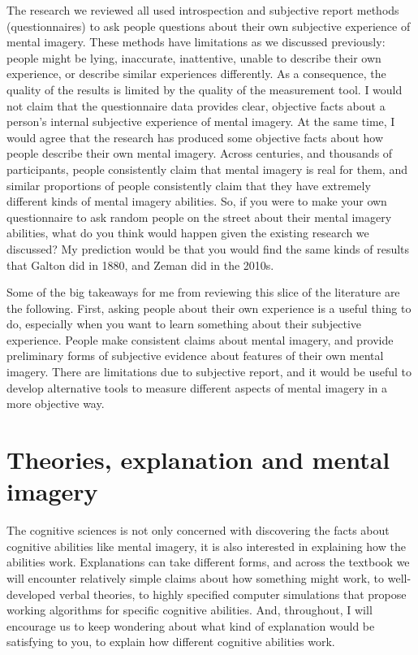 \documentclass[
  oneside,
  12pt]{crumpbook}
\begin{document}
The research we reviewed all used introspection and subjective report methods (questionnaires) to ask people questions about their own subjective experience of mental imagery. These methods have limitations as we discussed previously: people might be lying, inaccurate, inattentive, unable to describe their own experience, or describe similar experiences differently. As a consequence, the quality of the results is limited by the quality of the measurement tool. I would not claim that the questionnaire data provides clear, objective facts about a person's internal subjective experience of mental imagery. At the same time, I would agree that the research has produced some objective facts about how people describe their own mental imagery. Across centuries, and thousands of participants, people consistently claim that mental imagery is real for them, and similar proportions of people consistently claim that they have extremely different kinds of mental imagery abilities. So, if you were to make your own questionnaire to ask random people on the street about their mental imagery abilities, what do you think would happen given the existing research we discussed? My prediction would be that you would find the same kinds of results that Galton did in 1880, and Zeman did in the 2010s.

Some of the big takeaways for me from reviewing this slice of the literature are the following. First, asking people about their own experience is a useful thing to do, especially when you want to learn something about their subjective experience. People make consistent claims about mental imagery, and provide preliminary forms of subjective evidence about features of their own mental imagery. There are limitations due to subjective report, and it would be useful to develop alternative tools to measure different aspects of mental imagery in a more objective way.

\hypertarget{theories-explanation-and-mental-imagery}{%
\section{Theories, explanation and mental imagery}\label{theories-explanation-and-mental-imagery}}

The cognitive sciences is not only concerned with discovering the facts about cognitive abilities like mental imagery, it is also interested in explaining how the abilities work. Explanations can take different forms, and across the textbook we will encounter relatively simple claims about how something might work, to well-developed verbal theories, to highly specified computer simulations that propose working algorithms for specific cognitive abilities. And, throughout, I will encourage us to keep wondering about what kind of explanation would be satisfying to you, to explain how different cognitive abilities work.
\end{document}
